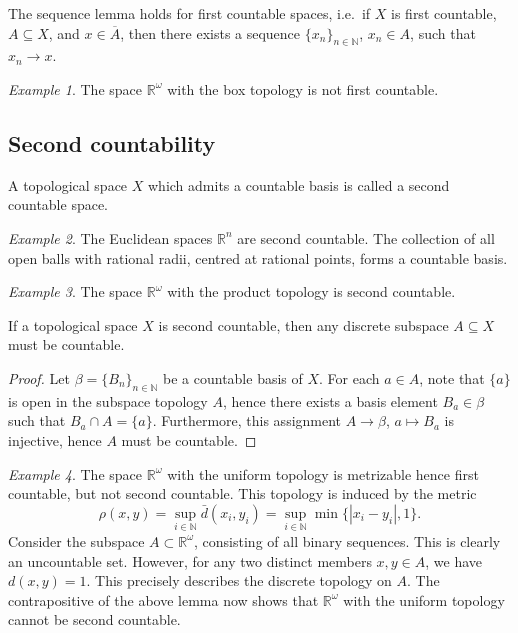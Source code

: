 \documentclass[11pt]{article}
\newcommand{\R}{\mathbb{R}}
\newcommand{\N}{\mathbb{N}}
\theoremstyle{definition}
\theoremstyle{remark}
\newtheorem*{example}{Example}
\numberwithin{equation}{section}
\begin{document}
    \begin{lemma}
        The sequence lemma holds for first countable spaces, i.e.\ if $X$ is first
        countable, $A \subseteq X$, and $x \in \overline{A}$, then there exists a
        sequence $\{x_n\}_{n \in \N}$, $x_n \in A$, such that $x_n \to x$.
    \end{lemma}

    \begin{example}
        The space $\R^\omega$ with the box topology is not first countable.
    \end{example}


    \subsection{Second countability}
    
    \begin{definition}
        A topological space $X$ which admits a countable basis is called a second
        countable space.
    \end{definition}
    \begin{example}
        The Euclidean spaces $\R^n$ are second countable. The collection of all open
        balls with rational radii, centred at rational points, forms a countable basis.
    \end{example}
    \begin{example}
        The space $\R^\omega$ with the product topology is second countable.
    \end{example}
    \begin{lemma}
        If a topological space $X$ is second countable, then any discrete subspace
        $A\subseteq X$ must be countable.
    \end{lemma}

    \begin{proof}
        Let $\beta = \{B_n\}_{n \in \N}$ be a countable basis of $X$. For each $a \in
        A$, note that $\{a\}$ is open in the subspace topology $A$, hence there
        exists a basis element $B_a \in \beta$ such that $B_a \cap A = \{a\}$.
        Furthermore, this assignment $A \to \beta$, $a \mapsto B_a$ is injective,
        hence $A$ must be countable.
    \end{proof}

    \begin{example}
        The space $\R^\omega$ with the uniform topology is metrizable hence first
        countable, but not second countable. This topology is induced by the metric
        \[
            \rho(x, y) = \sup_{i \in \N} \bar{d}(x_i, y_i) = \sup_{i \in \N}
            \min\{|x_i - y_i|, 1\}.
        \] Consider the subspace $A \subset \R^\omega$, consisting of all binary
        sequences. This is clearly an uncountable set. However, for any two distinct
        members $x, y \in A$, we have $d(x, y) = 1$. This precisely describes the
        discrete topology on $A$. The contrapositive of the above lemma now shows
        that $\R^\omega$ with the uniform topology cannot be second countable.
    \end{example}
\end{document}
